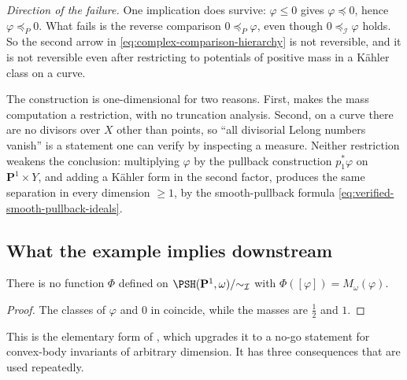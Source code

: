 \begin{example}
\emph{Direction of the failure.}  One implication does survive:
\(\varphi\leq0\) gives \(\varphi\preceq0\), hence
\(\varphi\preceq_P0\).  What fails is the reverse comparison
\(0\preceq_P\varphi\), even though \(0\preceq_{\mathcal I}\varphi\) holds.
So the second arrow in \eqref{eq:complex-comparison-hierarchy} is not
reversible, and it is not reversible even after restricting to potentials
of positive mass in a K\"ahler class on a curve.
\end{example}

\begin{remark}
\label{rem:ch51-cantor-dimension}
The construction is one-dimensional for two reasons.  First,
 makes the mass computation a
restriction, with no truncation analysis.  Second, on a curve there are
no divisors over \(X\) other than points, so ``all divisorial Lelong
numbers vanish'' is a statement one can verify by inspecting a measure.
Neither restriction weakens the conclusion: multiplying \(\varphi\) by the
pullback construction \(p_1^*\varphi\) on \(\mathbf P^1\times Y\), and
adding a K\"ahler form in the second factor, produces the same separation
in every dimension \(\geq1\), by the smooth-pullback formula
\eqref{eq:verified-smooth-pullback-ideals}.
\end{remark}

\subsection{What the example implies downstream}
\label{sec:ch51-cantor-consequences}

\begin{corollary}
\label{cor:ch51-no-i-invariant-mass}
There is no function \(\Phi\) defined on
\(\PSH(\mathbf P^1,\omega)/{\sim_{\mathcal I}}\) with
\(\Phi([\varphi])=M_\omega(\varphi)\).
\end{corollary}

\begin{proof}
The classes of \(\varphi\) and \(0\) in
 coincide, while the masses are \(\tfrac12\) and
\(1\).
\end{proof}

This is the elementary form of , which
upgrades it to a no-go statement for convex-body invariants of arbitrary
dimension.  It has three consequences that are used repeatedly.

